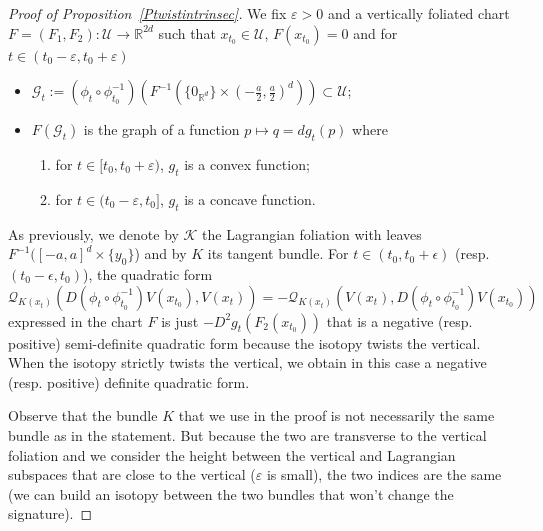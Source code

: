 \documentclass[10pt,a4paper]{amsart}
\numberwithin{equation}{section}
\newcommand*\cq{\mathcal{Q}}
\newcommand*\cg{\mathcal{G}}
\newcommand*\cU{\mathcal{U}}
\newcommand*\cal{\mathcal}
\newcommand*\R{\mathbb{R}}
\theoremstyle{definition}
\theoremstyle{remark}
\begin{document}
\begin{proof}[Proof of Proposition~\ref{Ptwistintrinsec}]
We fix $\varepsilon>0$ and a vertically foliated chart $F=(F_1, F_2): \cU\rightarrow\R^{2d}$ such that $x_{t_0}\in\cal U$, $F(x_{t_0})=0$ and for $t\in (t_0-\varepsilon, t_0+\varepsilon)$
\begin{itemize}
\item ${\cg}_t:=(\phi_t\circ\phi_{t_0}^{-1})(F^{-1}(\{ 0_{\R^d}\}\times (-\frac{a}{2}, \frac{a}{2})^d)) \subset\cU$;
\item $F({\cg_t})$ is the graph of a function $p\mapsto q=dg_t(p)$ where
\begin{enumerate}
\item for $t\in [t_0, t_0+\varepsilon)$, $g_t$ is a convex function;
\item for $t\in (t_0-\varepsilon, t_0]$, $g_t$ is a concave function.
\end{enumerate}
\end{itemize}
As previously, we denote by ${\cal K}$ the Lagrangian foliation with leaves $F^{-1}([-a, a]^d\times \{y_0\}$) and by $K$ its tangent bundle. For $t\in(t_0,t_0+\epsilon)$ (resp. $(t_0-\epsilon, t_0)$), the quadratic form
\[
\cq_{K(x_t)}\left(D\left(\phi_t\circ \phi_{t_0}^{-1}\right)V(x_{t_0}), V(x_t)\right)=-\cq_{K(x_t)}\left(V(x_t), D\left(\phi_t\circ \phi_{t_0}^{-1}\right)V(x_{t_0})\right)
\]
expressed in the chart $F$ is just $-D^2g_t(F_2(x_{t_0}))$ that is a negative (resp. positive) semi-definite quadratic form because the isotopy twists the vertical.\newline
When the isotopy strictly twists the vertical, we obtain in this case a negative (resp. positive) definite quadratic form.

Observe that the bundle $K$ that we use in the proof is not necessarily the same bundle as in the statement. But because the two are transverse to the vertical foliation and we consider the height between the vertical and Lagrangian subspaces that are close to the vertical ($\varepsilon$ is small), the two indices are the same (we can build an isotopy between the two bundles that won't change the signature).
\end{proof}
\end{document}
